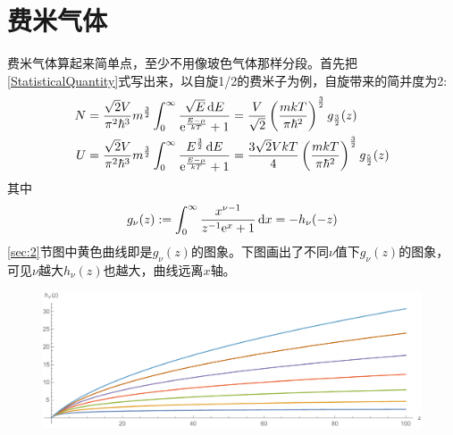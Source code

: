 \documentclass[]{article}
\begin{document}
	\section{费米气体}
	费米气体算起来简单点，至少不用像玻色气体那样分段。首先把\eqref{StatisticalQuantity}式写出来，以自旋1/2的费米子为例，自旋带来的简并度为2:
	\begin{subequations}\label{24}\begin{align}
		N&=\frac{\sqrt{2}V}{\pi^2\hbar^3}m^{\frac{3}{2}}\int_0^\infty\frac{\sqrt{E}\mathop{}\!\mathrm{d} E}{\mathrm{e}^{\frac{E-\mu}{kT}}+1}=\frac{V}{\sqrt{2}}\left(\frac{mkT}{\pi\hbar^2}\right)^{\frac{3}{2}}g_{\frac 32}(z)\label{24a}\\
		U&=\frac{\sqrt{2}V}{\pi^2\hbar^3}m^{\frac{3}{2}}\int_0^\infty\frac{E^{\frac 32}\mathop{}\!\mathrm{d} E}{\mathrm{e}^{\frac{E-\mu}{kT}}+1}=\frac{3\sqrt{2}VkT}{4}\left(\frac{mkT}{\pi\hbar^2}\right)^{\frac 32}g_{\frac 52}(z)
	\end{align}\end{subequations}
	其中
	\[g_\nu(z):=\int_0^\infty\frac{x^{\nu-1}}{z^{-1}\mathrm{e}^x+1}\mathop{}\!\mathrm{d} x=-h_\nu(-z)\]
	\ref{sec:2}节图中黄色曲线即是$ g_\nu(z) $的图象。下图画出了不同$ \nu $值下$ g_\nu(z) $的图象，可见$ \nu $越大$ h_\nu(z) $也越大，曲线远离$ x $轴。
	\begin{figure}[h]
		\includegraphics[width=\linewidth]{fig2}
	\end{figure}
	
\end{document}

